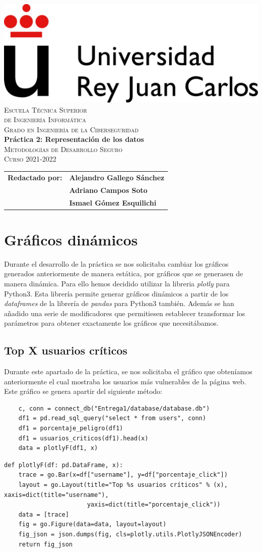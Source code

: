 \documentclass[12pt, a4paper,twoside,titlepage]{article}
\newcommand{\grado}{Grado en Ingeniería de la Ciberseguridad}
\newcommand{\pregunta} {Práctica 2: Representación de los datos}
\newcommand{\asignatura}{Metodologías de Desarrollo Seguro}
\newcommand{\curso}{Curso 2021-2022}
\newcommand{\autorA}{Alejandro Gallego Sánchez}
\newcommand{\autorB}{Adriano Campos Soto}
\newcommand{\autorC}{Ismael Gómez Esquilichi}
\renewcommand*{\maketitle}{%
\begin{titlepage}
  \pagestyle{plain}

  \begin{center}
    \vspace*{-4em}
    \includegraphics[scale=.3]{Figuras/urjc.jpg}\\
    \vspace*{2em}
    \textsc{\LARGE Escuela Técnica Superior\\de Ingeniería Informática}\\
    \vspace*{2em}
    \textsc{\Large \grado}\\  
    \vspace*{\fill}
    \textbf{\LARGE \pregunta\\}  
    \vspace*{2em}
    \textsc{\large \asignatura\\}
    \vspace*{.5em}
    \textsc{\large \curso\\}  
    \vspace*{4em}\vspace*{\fill}
    \vspace*{4em}\vspace*{\fill}
    {%
      \large
      \begin{tabular}{rl}
        \textbf{Redactado por:} & \textbf{\autorA}\\
         & \textbf{\autorB}\\
         & \textbf{\autorC} \\
      \end{tabular}
    }
  \end{center}
  
\end{titlepage}
}
\begin{document}
\maketitle

\thispagestyle{empty}
\tableofcontents
\thispagestyle{empty}
\newpage
\setcounter{page}{1} %
\pagestyle{plain}

\section{Gráficos dinámicos}
Durante el desarrollo de la práctica se nos solicitaba cambiar los gráficos generados anteriormente de manera estática, por gráficos que se generasen de manera dinámica. Para ello hemos decidido utilizar la libreria \emph{plotly} para Python3. Esta librería permite generar gráficos dinámicos a partir de los \emph{dataframes} de la librería de \emph{pandas} para Python3 también. Además se han añadido una serie de modificadores que permitiesen establecer transformar los parámetros para obtener exactamente los gráficos que necesitábamos. 
\subsection{Top X usuarios críticos}
Durante este apartado de la práctica, se nos solicitaba el gráfico que obteníamos anteriormente el cual mostraba los usuarios más vulnerables de la página web. Este gráfico se genera apartir del siguiente método:
\begin{verbatim}
    c, conn = connect_db("Entrega1/database/database.db")
    df1 = pd.read_sql_query("select * from users", conn)
    df1 = porcentaje_peligro(df1)
    df1 = usuarios_criticos(df1).head(x)
    data = plotlyF(df1, x)
\end{verbatim}
\begin{verbatim}
def plotlyF(df: pd.DataFrame, x):
    trace = go.Bar(x=df["username"], y=df["porcentaje_click"])
    layout = go.Layout(title="Top %s usuarios críticos" % (x), xaxis=dict(title="username"),
                       yaxis=dict(title="porcentaje_click"))
    data = [trace]
    fig = go.Figure(data=data, layout=layout)
    fig_json = json.dumps(fig, cls=plotly.utils.PlotlyJSONEncoder)
    return fig_json
\end{verbatim}
\end{document}
